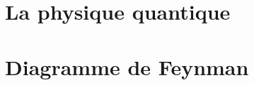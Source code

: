 \chapter{La physique quantique}
%

%
\chapter{Diagramme de Feynman}
%

%

%

%

%
%
%
%
%
%
%
%
%
%
%
%
%
